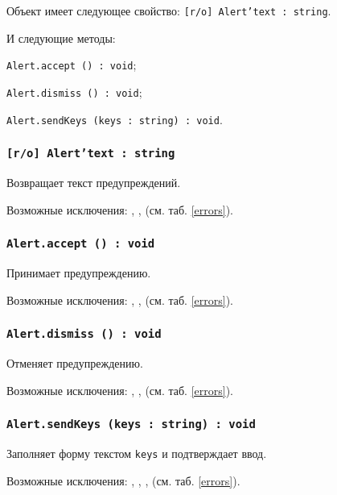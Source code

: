 Объект \alert{} имеет следующее свойство: \texttt{[r/o] Alert'text : string}.

И следующие методы:
\begin{icItems}
	\item \texttt{Alert.accept () : void};
	\item \texttt{Alert.dismiss () : void};
	\item \texttt{Alert.sendKeys (keys : string) : void}.
\end{icItems}

\subsubsection{\texttt{[r/o] Alert'text : string}}

Возвращает текст предупреждений.

Возможные исключения: , ,  (см. таб. \ref{errors}).

\subsubsection{\texttt{Alert.accept () : void}}

Принимает предупреждению.

Возможные исключения: , ,  (см. таб. \ref{errors}).

\subsubsection{\texttt{Alert.dismiss () : void}}

Отменяет предупреждению.

Возможные исключения: , ,  (см. таб. \ref{errors}).

\subsubsection{\texttt{Alert.sendKeys (keys : string) : void}}

Заполняет форму текстом \texttt{keys} и подтверждает ввод.

Возможные исключения: , , ,  (см. таб. \ref{errors}).


